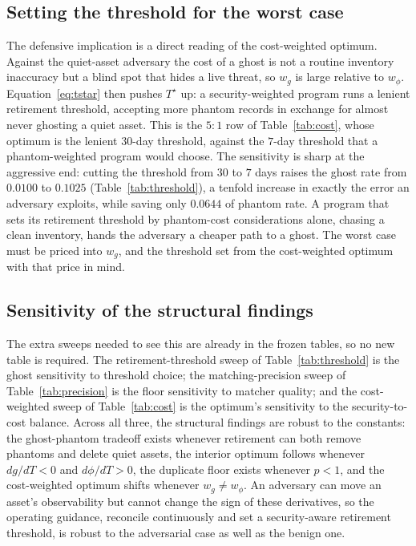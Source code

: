 \documentclass[journal]{IEEEtran}
\begin{document}
\subsection{Setting the threshold for the worst case}
The defensive implication is a direct reading of the cost-weighted optimum. Against the quiet-asset
adversary the cost of a ghost is not a routine inventory inaccuracy but a blind spot that hides a
live threat, so $w_g$ is large relative to $w_\phi$. Equation~\eqref{eq:tstar} then pushes $T^\star$
up: a security-weighted program runs a lenient retirement threshold, accepting more phantom records
in exchange for almost never ghosting a quiet asset. This is the $5 : 1$ row of
Table~\ref{tab:cost}, whose optimum is the lenient $30$-day threshold, against the $7$-day threshold
that a phantom-weighted program would choose. The sensitivity is sharp at the aggressive end: cutting
the threshold from $30$ to $7$ days raises the ghost rate from $0.0100$ to $0.1025$
(Table~\ref{tab:threshold}), a tenfold increase in exactly the error an adversary exploits, while
saving only $0.0644$ of phantom rate. A program that sets its retirement threshold by phantom-cost
considerations alone, chasing a clean inventory, hands the adversary a cheaper path to a ghost. The
worst case must be priced into $w_g$, and the threshold set from the cost-weighted optimum with that
price in mind.

\subsection{Sensitivity of the structural findings}
The extra sweeps needed to see this are already in the frozen tables, so no new table is required.
The retirement-threshold sweep of Table~\ref{tab:threshold} is the ghost sensitivity to threshold
choice; the matching-precision sweep of Table~\ref{tab:precision} is the floor sensitivity to matcher
quality; and the cost-weighted sweep of Table~\ref{tab:cost} is the optimum's sensitivity to the
security-to-cost balance. Across all three, the structural findings are robust to the constants:
the ghost-phantom tradeoff exists whenever retirement can both remove phantoms and delete quiet
assets, the interior optimum follows whenever $dg/dT < 0$ and $d\phi/dT > 0$, the duplicate floor
exists whenever $p < 1$, and the cost-weighted optimum shifts whenever $w_g \neq w_\phi$. An adversary
can move an asset's observability but cannot change the sign of these derivatives, so the operating
guidance, reconcile continuously and set a security-aware retirement threshold, is robust to the
adversarial case as well as the benign one.
\end{document}
